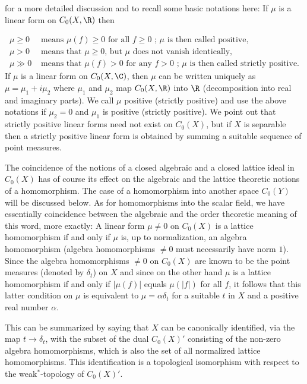 
for a more detailed discussion and to recall some basic notations here: If $\mu$ is a linear form on $C_{0}(X,\R)$ then

\[
\begin{aligned}
	\mu \geq 0 &\text{ means } \mu(f) \geq 0 \text{ for all } f \geq 0 \text{ ; } \mu \text{ is then called positive}, \\
	\mu > 0 &\text{ means that } \mu \geq 0 \text{, but } \mu \text{ does not vanish identically}, \\
	\mu \gg 0 &\text{ means that } \mu(f) > 0 \text{ for any } f > 0 \text{ ; } \mu \text{ is then called strictly positive}.
\end{aligned}
\]
If $\mu$ is a linear form on $C_{0}(X,\C)$, then $\mu$ can be written uniquely as $\mu = \mu_{1} + i\mu_{2}$ where $\mu_{1}$ and $\mu_{2}$ map $C_{0}(X,\R)$ into $\R$ (decomposition into real and imaginary parts).
We call $\mu$ positive (strictly positive) and use the above notations if $\mu_{2} = 0$ and $\mu_{1}$ is positive (strictly positive).
We point out that strictly positive linear forms need not exist on $C_{0}(X)$, but if $X$ is separable then a strictly positive linear form is obtained by summing a suitable sequence of point measures.

The coincidence of the notions of a closed algebraic and a closed lattice ideal in $C_{0}(X)$ has of course its effect on the algebraic and the lattice theoretic notions of a homomorphism.
The case of a homomorphism into another space $C_{0}(Y)$ will be discussed below.
As for homomorphisms into the scalar field, we have essentially coincidence between the algebraic and the order theoretic meaning of this word, more exactly: A linear form $\mu \neq 0$ on $C_{0}(X)$ is a lattice homomorphism if and only if $\mu$ is, up to normalization, an algebra homomorphism (algebra homomorphisms $\neq 0$ must necessarily have norm $1$).
Since the algebra homomorphisms $\neq 0$ on $C_{0}(X)$ are known to be the point measures (denoted by $\delta_{t}$) on $X$ and since on the other hand $\mu$ is a lattice homomorphism if and only if $|\mu(f)|$ equals $\mu(|f|)$ for all $f$, it follows that this latter condition on $\mu$ is equivalent to $\mu = \alpha\delta_{t}$ for a suitable $t$ in $X$ and a positive real number $\alpha$.

This can be summarized by saying that $X$ can be canonically identified, via the map $t \to \delta_{t}$, with the subset of the dual $C_{0}(X)'$ consisting of the non-zero algebra homomorphisms, which is also the set of all normalized lattice homomorphisms.
This identification is a topological isomorphism with respect to the weak$^{*}$-topology of $C_{0}(X)'$.

